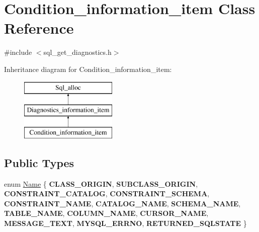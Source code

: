 \hypertarget{classCondition__information__item}{}\section{Condition\+\_\+information\+\_\+item Class Reference}
\label{classCondition__information__item}


{\ttfamily \#include $<$sql\+\_\+get\+\_\+diagnostics.\+h$>$}

Inheritance diagram for Condition\+\_\+information\+\_\+item\+:\begin{figure}[H]
\begin{center}
\leavevmode
\includegraphics[height=3.000000cm]{classCondition__information__item}
\end{center}
\end{figure}
\subsection*{Public Types}
\begin{DoxyCompactItemize}
\item 
enum \mbox{\hyperlink{classCondition__information__item_aa66f80b798aacf01030f1e8a755e9267}{Name}} \{ \newline
{\bfseries C\+L\+A\+S\+S\+\_\+\+O\+R\+I\+G\+IN}, 
{\bfseries S\+U\+B\+C\+L\+A\+S\+S\+\_\+\+O\+R\+I\+G\+IN}, 
{\bfseries C\+O\+N\+S\+T\+R\+A\+I\+N\+T\+\_\+\+C\+A\+T\+A\+L\+OG}, 
{\bfseries C\+O\+N\+S\+T\+R\+A\+I\+N\+T\+\_\+\+S\+C\+H\+E\+MA}, 
\newline
{\bfseries C\+O\+N\+S\+T\+R\+A\+I\+N\+T\+\_\+\+N\+A\+ME}, 
{\bfseries C\+A\+T\+A\+L\+O\+G\+\_\+\+N\+A\+ME}, 
{\bfseries S\+C\+H\+E\+M\+A\+\_\+\+N\+A\+ME}, 
{\bfseries T\+A\+B\+L\+E\+\_\+\+N\+A\+ME}, 
\newline
{\bfseries C\+O\+L\+U\+M\+N\+\_\+\+N\+A\+ME}, 
{\bfseries C\+U\+R\+S\+O\+R\+\_\+\+N\+A\+ME}, 
{\bfseries M\+E\+S\+S\+A\+G\+E\+\_\+\+T\+E\+XT}, 
{\bfseries M\+Y\+S\+Q\+L\+\_\+\+E\+R\+R\+NO}, 
\newline
{\bfseries R\+E\+T\+U\+R\+N\+E\+D\+\_\+\+S\+Q\+L\+S\+T\+A\+TE}
 \}
\end{DoxyCompactItemize}
